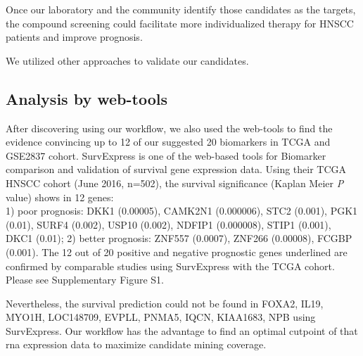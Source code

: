 \documentclass[jpm,article,submit,moreauthors,pdftex]{Definitions/mdpi}
\begin{document}
\begin{paracol}{2}
Once our laboratory and the community identify those candidates as the targets, the compound screening could facilitate more individualized therapy for HNSCC patients and improve prognosis.

We utilized other approaches to validate our candidates.

\subsection*{Analysis by web-tools}
After discovering using our workflow, we also used the web-tools to find the evidence convincing up to 12 of our suggested 20 biomarkers in TCGA and GSE2837 cohort.
SurvExpress\cite{Aguirre-Gamboa2013} is one of the web-based tools for Biomarker comparison and validation of survival gene expression data. Using their TCGA HNSCC cohort (June 2016, n=502), the survival significance (Kaplan Meier \textit{P} value) shows in 12 genes:\\ %
1) poor prognosis: DKK1 (0.00005), CAMK2N1 (0.000006), STC2 (0.001), PGK1 (0.01), SURF4 (0.002), USP10 (0.002), NDFIP1 (0.000008), STIP1 (0.001), DKC1 (0.01);
2) better prognosis: ZNF557 (0.0007), ZNF266 (0.00008), FCGBP (0.001).
The 12 out of 20 positive and negative prognostic genes underlined are confirmed by comparable studies using SurvExpress with the TCGA cohort. Please see Supplementary Figure S1. %


Nevertheless, the survival prediction could not be found in FOXA2, IL19, MYO1H, LOC148709, EVPLL, PNMA5, IQCN, KIAA1683, NPB using SurvExpress. 
Our workflow has the advantage to find an optimal cutpoint of that \acrshort{rna} expression data to maximize candidate mining coverage.


\end{paracol}
\end{document}
